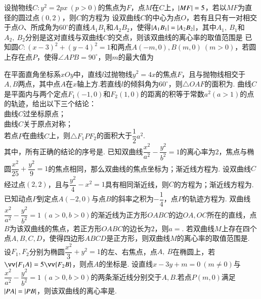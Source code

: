 \documentclass[marginline,noindent,answers,adobefonts]{BHCexam}
\begin{document}
\begin{questions}
\qs 设抛物线$ C:y^2=2px~(p>0) $的焦点为$ F $，点$ M $在$ C $上，$ \left|MF\right|=5 $，若以$ MF $为直径的圆过点$ \left(0,2\right) $，则$ C $的方程为\xx
{}
\qs 设双曲线$ C $的中心为点$ O $，若有且只有一对相交于点$ O $、所成角为$ 60^{\circ} $的直线$ A_1B_1 $和$ A_2B_2 $，使得$ \left|A_1B_1\right|=\left|A_2B_2\right| $，其中$ A_1,~B_1 $和$ A_2,~B_2 $分别是这对直线与双曲线$ C $的交点，则该双曲线的离心率的取值范围是\xx
\twoch{$ \left(\dfrac{2\sqrt{3}}{3},2\right]$}{$ \left[\dfrac{2\sqrt{3}}{3},2\right)$}{$\left(\dfrac{2\sqrt{3}}{3},+\infty\right) $}{$ \left[\dfrac{2\sqrt{3}}{3},+\infty\right)$}
\qs 已知圆$ C:(x-3)^2+(y-4)^2=1 $和两点$ A(-m,0),B(m,0)~(m>0) $，若圆上存在点$ P $，使得$ \angle APB=90^{\circ} $，则$ m $的最大值为\xx
{}

\qs 在平面直角坐标系$xOy$中，直线$ l $过抛物线$y^2=4x$的焦点$ F $，且与抛物线相交于$ A,B $两点，其中点$ A $在$x$轴上方.若直线$ l $的倾斜角为$ 60^{\circ} $，则$ \triangle OAF $的面积为\tk.
\qs 曲线$ C $是平面内与两个定点$ F_1(-1,0) $和$ F_2(1,0) $的距离的积等于常数$ a^2 (a>1)$的点的轨迹，给出以下三个结论：\\
曲线$ C $过坐标原点；\\
曲线$ C $关于原点对称；\\
若点$ P $在曲线$ C $上，则$ \triangle F_1PF_2 $的面积大于$ \dfrac{1}{2}a^2 $.\\
其中，所有正确的结论的序号是\tk.
\qs 已知双曲线$\dfrac{x^2}{a^2}-\dfrac{y^2}{b^2}=1$的离心率为$ 2 $，焦点与椭圆$ \dfrac{x^2}{25}+\dfrac{y^2}{9}=1 $的焦点相同，那么双曲线的焦点坐标为\tk；渐近线方程为\tk.
\qs 设双曲线$ C $经过点$ \left(2,2\right) $，且与$ \dfrac{y^2}{4}-x^2=1 $具有相同渐近线，则$ C $的方程为\tk；渐近线方程为\tk. 
\qs 已知动点$ P $到定点$ A(-2,0) $与点$ B$的斜率之积为$ -\dfrac{1}{4} $，点$ P $的轨迹方程为\tk.
\qs 双曲线$\dfrac{x^2}{a^2}-\dfrac{y^2}{b^2}=1~(a>0,b>0)$的渐近线为正方形$ OABC $的边$ OA,OC $所在的直线，点$ B $为该双曲线的焦点，若正方形$ OABC $的边长为$ 2 $，则$ a= $\tk.
\qs 若双曲线$ M $上存在四个点$ A,B,C,D $，使得四边形$ ABCD $是正方形，则双曲线$ M $的离心率的取值范围是\tk.
\qs 设$ F_1,F_2 $分别为椭圆$ \dfrac{x^2}{3}+y^2=1 $的左、右焦点，点$ A,~B $在椭圆上，若$ \vv{F_1A}=5\vv{F_2B} $，则点$ A $的坐标是\tk.
\qs 设直线$ x-3y+m=0 ~(m\ne0)$与$ \dfrac{x^2}{a^2}-\dfrac{y^2}{b^2}=1~(a>0,b>0)$的两条渐近线分别交于$ A,B .$若点$ P(m,0) $满足$ \left|PA\right|=\left|PB\right| $，则该双曲线的离心率是\tk.
\end{questions}
\end{document}
